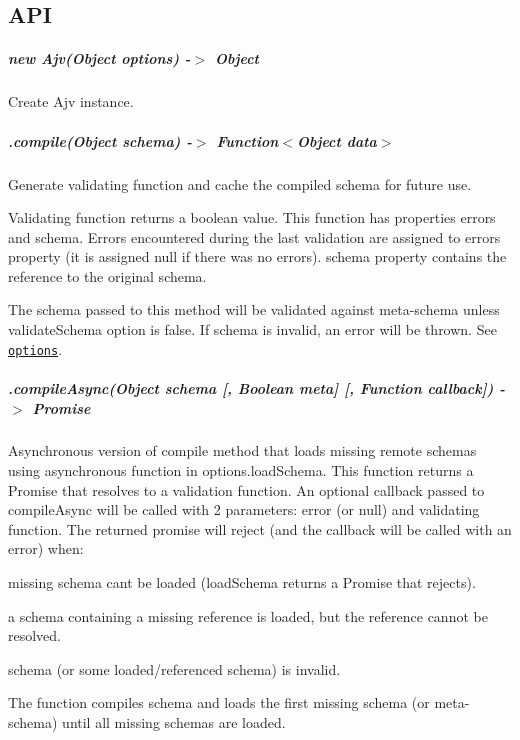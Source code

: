 \subsection*{A\+PI}

\subparagraph*{new Ajv(\+Object options) -\/$>$ Object}

Create Ajv instance.

\subparagraph*{.compile(\+Object schema) -\/$>$ Function$<$Object data$>$}

Generate validating function and cache the compiled schema for future use.

Validating function returns a boolean value. This function has properties {\ttfamily errors} and {\ttfamily schema}. Errors encountered during the last validation are assigned to {\ttfamily errors} property (it is assigned {\ttfamily null} if there was no errors). {\ttfamily schema} property contains the reference to the original schema.

The schema passed to this method will be validated against meta-\/schema unless {\ttfamily validate\+Schema} option is false. If schema is invalid, an error will be thrown. See \href{#options}{\tt options}.

\subparagraph*{\label{_api-compileAsync}%
.compile\+Async(\+Object schema \mbox{[}, Boolean meta\mbox{]} \mbox{[}, Function callback\mbox{]}) -\/$>$ Promise}

Asynchronous version of {\ttfamily compile} method that loads missing remote schemas using asynchronous function in {\ttfamily options.\+load\+Schema}. This function returns a Promise that resolves to a validation function. An optional callback passed to {\ttfamily compile\+Async} will be called with 2 parameters\+: error (or null) and validating function. The returned promise will reject (and the callback will be called with an error) when\+:


\begin{DoxyItemize}
\item missing schema can\textquotesingle{}t be loaded ({\ttfamily load\+Schema} returns a Promise that rejects).
\item a schema containing a missing reference is loaded, but the reference cannot be resolved.
\item schema (or some loaded/referenced schema) is invalid.
\end{DoxyItemize}

The function compiles schema and loads the first missing schema (or meta-\/schema) until all missing schemas are loaded.

